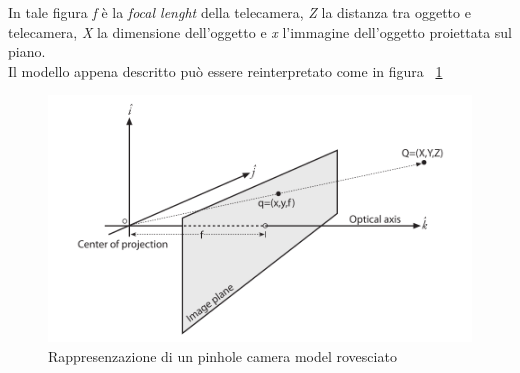 In tale figura \textit{f} è la \textit{focal lenght} della telecamera, \textit{Z} la distanza tra oggetto e telecamera, \textit{X} la dimensione dell'oggetto e \textit{x} l'immagine dell'oggetto proiettata sul piano. \\ Il modello appena descritto può essere reinterpretato come in figura ~\ref{fig:calib2} 
\begin{figure}[htpb] 
\centering 
\includegraphics[scale=0.4]{./images/calib2.png} 
\caption{Rappresenzazione di un pinhole camera model rovesciato} 
\label{fig:calib2}
\end{figure} 

